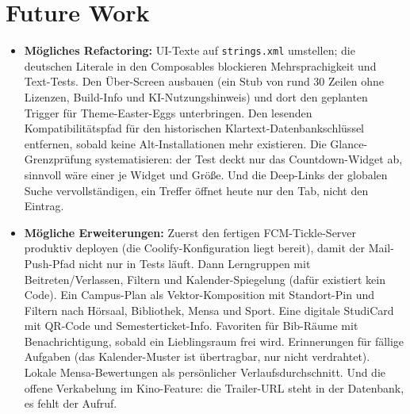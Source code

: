 \documentclass{msereport}
\begin{document}
\msegap

\section{Future Work}

\begin{itemize}
  \item \textbf{Mögliches Refactoring:} UI-Texte auf \texttt{strings.xml}
        umstellen; die deutschen Literale in den Composables blockieren
        Mehrsprachigkeit und Text-Tests. Den Über-Screen ausbauen (ein Stub von
        rund 30 Zeilen ohne Lizenzen, Build-Info und KI-Nutzungshinweis) und
        dort den geplanten Trigger für Theme-Easter-Eggs unterbringen.
        Den lesenden Kompatibilitätspfad für den historischen
        Klartext-Datenbankschlüssel entfernen, sobald keine Alt-Installationen
        mehr existieren. Die Glance-Grenzprüfung systematisieren: der Test deckt
        nur das Countdown-Widget ab, sinnvoll wäre einer je Widget und Größe. Und
        die Deep-Links der globalen Suche vervollständigen, ein Treffer öffnet
        heute nur den Tab, nicht den Eintrag.
  \item \textbf{Mögliche Erweiterungen:} Zuerst den fertigen FCM-Tickle-Server
        produktiv deployen (die Coolify-Konfiguration liegt bereit), damit der
        Mail-Push-Pfad nicht nur in Tests läuft. Dann Lerngruppen mit
        Beitreten/Verlassen, Filtern und Kalender-Spiegelung (dafür existiert
        kein Code). Ein Campus-Plan als Vektor-Komposition mit Standort-Pin und
        Filtern nach Hörsaal, Bibliothek, Mensa und Sport. Eine digitale
        StudiCard mit QR-Code und Semesterticket-Info. Favoriten für Bib-Räume
        mit Benachrichtigung, sobald ein Lieblingsraum frei wird. Erinnerungen
        für fällige Aufgaben (das Kalender-Muster ist übertragbar, nur nicht
        verdrahtet). Lokale Mensa-Bewertungen als persönlicher
        Verlaufsdurchschnitt. Und die offene Verkabelung im Kino-Feature: die
        Trailer-URL steht in der Datenbank, es fehlt der Aufruf.
\end{itemize}
\end{document}
